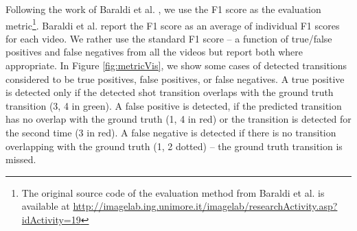 Following the work of Baraldi et al. \cite{Baraldi15}, we use the F1 score as the evaluation metric\footnote{The original source code of the evaluation method from Baraldi et al. is available at \url{http://imagelab.ing.unimore.it/imagelab/researchActivity.asp?idActivity=19}}. Baraldi et al. report the F1 score as an average of individual F1 scores for each video. We rather use the standard F1 score -- a function of true/false positives and false negatives from all the videos but report both where appropriate. In Figure \ref{fig:metricVis}, we show some cases of detected transitions considered to be true positives, false positives, or false negatives. A true positive is detected only if the detected shot transition overlaps with the ground truth transition (3, 4 in green). A false positive is detected, if the predicted transition has no overlap with the ground truth (1, 4 in red) or the transition is detected for the second time (3 in red). A false negative is detected if there is no transition overlapping with the ground truth (1, 2 dotted) -- the ground truth transition is missed.

